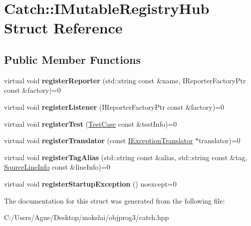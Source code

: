 \hypertarget{struct_catch_1_1_i_mutable_registry_hub}{}\section{Catch\+:\+:I\+Mutable\+Registry\+Hub Struct Reference}
\label{struct_catch_1_1_i_mutable_registry_hub}
\subsection*{Public Member Functions}
\begin{DoxyCompactItemize}
\item 
\mbox{\label{struct_catch_1_1_i_mutable_registry_hub_a1c0ac202ac31ee9f88e8ff5cbac4b243}} 
virtual void {\bfseries register\+Reporter} (std\+::string const \&name, I\+Reporter\+Factory\+Ptr const \&factory)=0
\item 
\mbox{\label{struct_catch_1_1_i_mutable_registry_hub_abd892a133f85581fd00ee75bb379ca56}} 
virtual void {\bfseries register\+Listener} (I\+Reporter\+Factory\+Ptr const \&factory)=0
\item 
\mbox{\label{struct_catch_1_1_i_mutable_registry_hub_a11b85c6744d88c9f83fe16ad4a8dd451}} 
virtual void {\bfseries register\+Test} (\mbox{\hyperlink{class_catch_1_1_test_case}{Test\+Case}} const \&test\+Info)=0
\item 
\mbox{\label{struct_catch_1_1_i_mutable_registry_hub_ae6825365102693cf7707db022a2c2b49}} 
virtual void {\bfseries register\+Translator} (const \mbox{\hyperlink{struct_catch_1_1_i_exception_translator}{I\+Exception\+Translator}} $\ast$translator)=0
\item 
\mbox{\label{struct_catch_1_1_i_mutable_registry_hub_abf2e386b6f94f615719ada711adbf822}} 
virtual void {\bfseries register\+Tag\+Alias} (std\+::string const \&alias, std\+::string const \&tag, \mbox{\hyperlink{struct_catch_1_1_source_line_info}{Source\+Line\+Info}} const \&line\+Info)=0
\item 
\mbox{\label{struct_catch_1_1_i_mutable_registry_hub_a72a7d5386851ac3200f8da794a009c86}} 
virtual void {\bfseries register\+Startup\+Exception} () noexcept=0
\end{DoxyCompactItemize}


The documentation for this struct was generated from the following file\+:\begin{DoxyCompactItemize}
\item 
C\+:/\+Users/\+Agne/\+Desktop/mokslai/objprog3/catch.\+hpp\end{DoxyCompactItemize}
